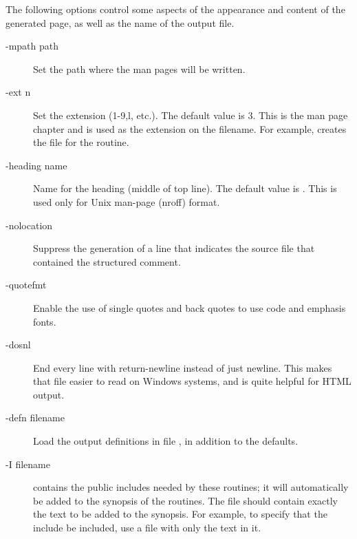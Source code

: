 \documentclass[twoside]{linfoem}
\begin{document}
The following options control some aspects of the appearance and content of the
generated page, as well as the name of the output file.
\begin{description}
\item[-mpath path]
Set the path where the man pages will be written.
\item[-ext n]
Set the extension (1-9,l, etc.).  The default value is 3.  This is the man page
chapter and is used as the extension on the filename.  For example,
 creates the file  for the  routine.
\item[-heading name]
Name for the heading (middle of top line).  The default value is .
This is used only for Unix man-page (nroff) format.
\item[-nolocation]
Suppress the generation of a line that indicates the source file that
contained the structured comment.
\item[-quotefmt]
Enable the use of single quotes and back quotes to use code and emphasis
fonts.
\item[-dosnl]
End every line with return-newline instead of just newline.  This makes that
file easier to read on Windows systems, and is quite helpful for HTML output.
\item[-defn filename]Load the output definitions in file , in
  addition to the defaults.  
\item[-I filename]
 contains the public includes needed by these routines; it will
automatically be added to the synopsis of the routines.  The file should
contain exactly the text to be added to the synopsis.  For example, to specify
that the include  be included, use a file with only the text
 in it.
\end{description}
\end{document}
